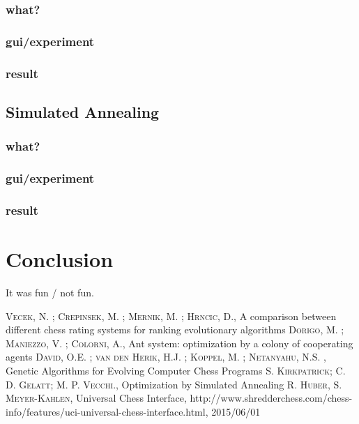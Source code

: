 \documentclass[pdftex]{article}
\begin{document}
\subsubsection{what?}
\subsubsection{gui/experiment}
\subsubsection{result}

\subsection{Simulated Annealing}
\label{sec:annealing}

\subsubsection{what?}
\subsubsection{gui/experiment}
\subsubsection{result}

\section{Conclusion}
\label{sec:conclusion}

It was fun / not fun.

\begin{thebibliography}{99}

 \textsc{Vecek, N. ; Crepinsek, M. ; Mernik, M. ; Hrncic, D.}, A comparison between different chess rating systems for ranking evolutionary algorithms 
 \textsc{Dorigo, M. ; Maniezzo, V. ; Colorni, A.}, Ant system: optimization by a colony of cooperating agents 
 \textsc{David, O.E. ; van den Herik, H.J. ; Koppel, M. ; Netanyahu, N.S. }, Genetic Algorithms for Evolving Computer Chess Programs 
 \textsc{S. Kirkpatrick; C. D. Gelatt; M. P. Vecchi.}, Optimization by Simulated Annealing 
 \textsc{R. Huber, S. Meyer-Kahlen}, Universal Chess Interface, http://www.shredderchess.com/chess-info/features/uci-universal-chess-interface.html, 2015/06/01

\end{thebibliography}
\end{document}
